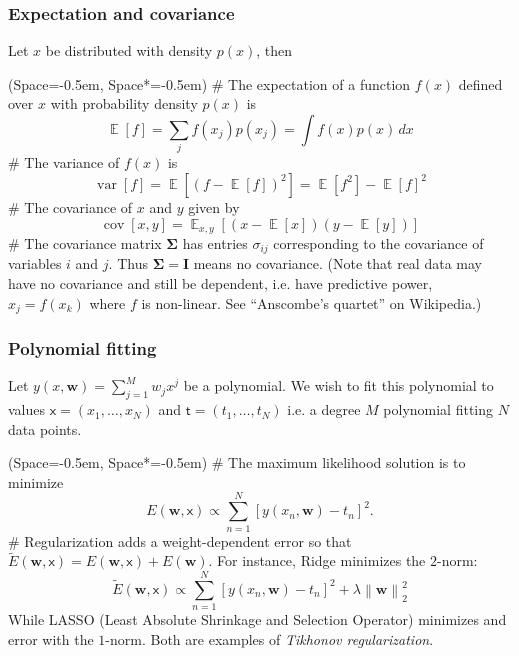 \documentclass[12pt, a4paper]{article}
\newcommand{\listSpace}{-0.5em}%
\renewcommand{\sf}[1]{\mathsf{#1}}
\newcommand{\vect}[1]{\bm{#1}}
\newcommand{\norm}[1]{\left\lVert#1\right\rVert}
\DeclareMathOperator{\E}{\mathbb{E}}
\DeclareMathOperator{\var}{\operatorname{var}}
\DeclareMathOperator{\cov}{\operatorname{cov}}
\begin{document}
\subsubsection*{Expectation and covariance}
Let $x$ be distributed with density $p(x)$, then
\begin{easylist}[itemize]
	\ListProperties(Space=\listSpace, Space*=\listSpace)
	# The expectation of a function $f(x)$ defined over $x$ with probability density $p(x)$ is
	\begin{equation*}
	\E[f] = \sum_j f(x_j) p (x_j) = \int f(x) p(x) \, dx
	\end{equation*}
	# The variance of $f(x)$ is
	\begin{equation*}
	\var[f] = \E \left[ (f - \E[f])^2\right] = \E[f^2] - \E[f]^2
	\end{equation*}
	# The covariance of $x$ and $y$ given by
	\begin{equation*}
	\cov[x, y] = \E_{x,y} \left[ (x - \E[x]) (y - \E[y])\right]
	\end{equation*}
	# The covariance matrix $\mathbf{\Sigma}$ has entries $\sigma_{ij}$ corresponding to the covariance of variables $i$ and $j$.
	Thus $\vect{\Sigma} = \vect{I}$ means no covariance.
	(Note that real data may have no covariance and still be dependent, i.e. have predictive power, $x_j = f(x_k)$ where $f$ is non-linear.
	See ``Anscombe's quartet'' on Wikipedia.)
\end{easylist}

\subsubsection*{Polynomial fitting}
Let $y(x, \vect{w}) = \sum_{j = 1}^{M} w_j x^j$ be a polynomial.
We wish to fit this polynomial to values $\sf{x} = \left(x_1, \dots, x_N\right)$ and $\sf{t} = \left(t_1, \dots, t_N\right)$
i.e. a degree $M$ polynomial fitting $N$ data points.

\begin{easylist}[itemize]
	\ListProperties(Space=\listSpace, Space*=\listSpace)
	# The maximum likelihood solution is to minimize
	\begin{equation*}
	E(\vect{w}, \mathsf{x}) \propto \sum_{n = 1}^{N} \left[ y (x_n, \vect{w}) - t_n\right]^2.
	\end{equation*}
	# Regularization adds a weight-dependent error so that $\widetilde{E}(\vect{w}, \mathsf{x}) = E(\vect{w}, \mathsf{x}) + E(\vect{w})$.
	For instance, Ridge minimizes the $2$-norm:
	\begin{equation*}
	\widetilde{E}(\vect{w}, \mathsf{x}) \propto \sum_{n = 1}^{N} \left[ y (x_n, \vect{w}) - t_n\right]^2 + \lambda \norm{\vect{w}}_2^2
	\end{equation*}
	While LASSO (Least Absolute Shrinkage and Selection Operator) minimizes and error with the $1$-norm.
	Both are examples of \emph{Tikhonov regularization}.
\end{easylist}
\end{document}
